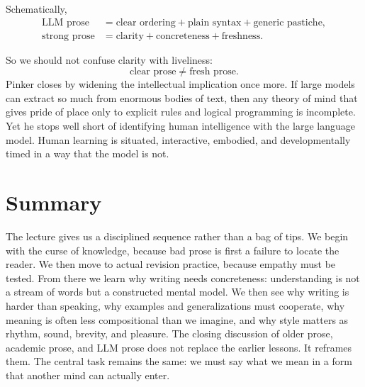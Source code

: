 Schematically,
\begin{align}
\text{LLM prose} &= \text{clear ordering} + \text{plain syntax} + \text{generic pastiche},\\
\text{strong prose} &= \text{clarity} + \text{concreteness} + \text{freshness}.
\end{align}

So we should not confuse clarity with liveliness:
\begin{equation}
\text{clear prose} \neq \text{fresh prose}.
\end{equation}
Pinker closes by widening the intellectual implication once more. If large models can extract so much from enormous bodies of text, then any theory of mind that gives pride of place only to explicit rules and logical programming is incomplete. Yet he stops well short of identifying human intelligence with the large language model. Human learning is situated, interactive, embodied, and developmentally timed in a way that the model is not.

\section{Summary}

The lecture gives us a disciplined sequence rather than a bag of tips. We begin with the curse of knowledge, because bad prose is first a failure to locate the reader. We then move to actual revision practice, because empathy must be tested. From there we learn why writing needs concreteness: understanding is not a stream of words but a constructed mental model. We then see why writing is harder than speaking, why examples and generalizations must cooperate, why meaning is often less compositional than we imagine, and why style matters as rhythm, sound, brevity, and pleasure. The closing discussion of older prose, academic prose, and LLM prose does not replace the earlier lessons. It reframes them. The central task remains the same: we must say what we mean in a form that another mind can actually enter.